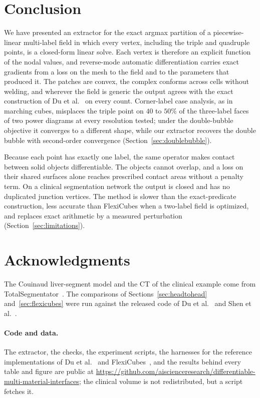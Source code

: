 \documentclass{egpubl}
\theoremstyle{definition}
\begin{document}
\section{Conclusion}

We have presented an extractor for the exact argmax partition of a
piecewise-linear multi-label field in which every vertex, including the
triple and quadruple points, is a closed-form linear solve. Each vertex is
therefore an explicit function of the nodal values, and reverse-mode automatic
differentiation carries exact gradients from a loss on the mesh to the field
and to the parameters that produced it. The patches are convex, the complex conforms
across cells without welding, and wherever the field is generic the
output agrees with the exact construction of Du et al.~\cite{du2022} on every
count. Corner-label case analysis, as in marching cubes, misplaces the triple
point on $40$ to $50\%$ of the three-label faces of two power diagrams at every
resolution tested; under the
double-bubble objective it converges to a different shape, while our
extractor recovers the double bubble with second-order convergence
(Section~\ref{sec:doublebubble}).

Because each point has exactly one label, the same operator makes contact
between solid objects differentiable. The objects cannot overlap, and a loss
on their shared surfaces alone reaches prescribed contact areas without a
penalty term. On a clinical segmentation network the output is closed and
has no duplicated junction vertices.
The method is slower than the exact-predicate construction, less accurate than
FlexiCubes when a two-label field is optimized, and replaces exact arithmetic
by a measured perturbation (Section~\ref{sec:limitations}).

\section*{Acknowledgments}

\noindent The Couinaud liver-segment model and the CT of the clinical example come
from TotalSegmentator~\cite{wasserthal2023}. The comparisons of
Sections~\ref{sec:headtohead} and~\ref{sec:flexicubes} were run against the
released code of Du et al.~\cite{du2022} and Shen et al.~\cite{shen2023}.

\paragraph*{Code and data.} The extractor, the checks, the experiment scripts,
the harnesses for the reference implementations of Du et al.~\cite{du2022}
and FlexiCubes~\cite{shen2023}, and the results behind every table and figure
are public at
\url{https://github.com/aiscienceresearch/differentiable-multi-material-interfaces};
the clinical volume is not redistributed, but a script fetches it.
\end{document}
